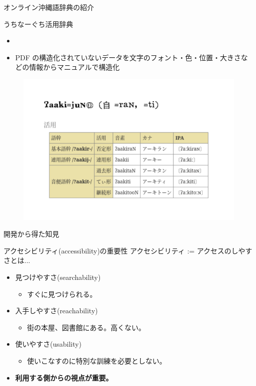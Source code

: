 \documentclass[14pt]{beamer}
\begin{document}
\begin{frame}{オンライン沖縄語辞典の紹介}
  \begin{block}{うちなーぐち活用辞典}
    \begin{itemize}
    \item 
    \item PDF の構造化されていないデータを文字のフォント・色・位置・大きさなどの情報からマニュアルで構造化
    \end{itemize}
    \begin{figure}[ht]
      \centering
      \begin{minipage}{0.4\paperwidth}
        \includegraphics[height=0.36\paperheight]{verb-conugation-comparison.png}
      \end{minipage}%
    \end{figure}
  \end{block}
\end{frame}
\begin{frame}{開発から得た知見}
  \begin{block}{アクセシビリティ(accessibility)の重要性}%
    \vspace{0pt}
    アクセシビリティ := アクセスのしやすさとは...
    \begin{itemize}
    \item 見つけやすさ(searchability)
      \begin{itemize}
        \item すぐに見つけられる。
      \end{itemize}
    \item 入手しやすさ(reachability)
      \begin{itemize}
      \item 街の本屋、図書館にある。高くない。
      \end{itemize}
    \item 使いやすさ(usability)
      \begin{itemize}
      \item 使いこなすのに特別な訓練を必要としない。
      \end{itemize}
    \item \textbf{利用する側からの視点が重要。}
    \end{itemize}
  \end{block}
\end{frame}
\end{document}
